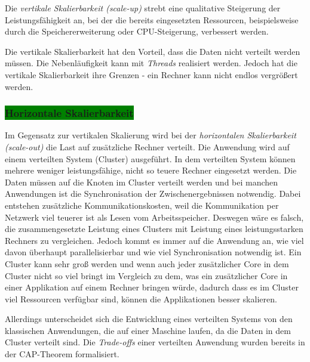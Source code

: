 Die \textit{vertikale Skalierbarkeit (scale-up)} strebt eine qualitative Steigerung der Leistungsfähigkeit an, bei der die bereits eingesetzten Ressourcen, beispielsweise durch die Speichererweiterung oder CPU-Steigerung, verbessert werden.

Die vertikale Skalierbarkeit hat den Vorteil, dass die Daten nicht verteilt werden müssen. Die Nebenläufigkeit kann mit \textit{Threads} realisiert werden. Jedoch hat die vertikale Skalierbarkeit ihre Grenzen - ein Rechner kann nicht endlos vergrößert werden. 

\subsubsection{\colorbox{green}{Horizontale Skalierbarkeit}}

Im Gegensatz zur vertikalen Skalierung wird bei der \textit{horizontalen Skalierbarkeit (scale-out)} die Last auf zusätzliche Rechner verteilt. Die Anwendung wird auf einem verteilten System (Cluster) ausgeführt. In dem verteilten System können mehrere weniger leistungsfähige, nicht so teuere Rechner eingesetzt werden. Die Daten müssen auf die Knoten im Cluster verteilt werden und bei manchen Anwendungen ist die Synchronisation der Zwischenergebnissen notwendig. Dabei entstehen zusätzliche Kommunikationskosten, weil die Kommunikation per Netzwerk viel teuerer ist als Lesen vom Arbeitsspeicher. Deswegen wäre es falsch, die zusammengesetzte Leistung eines Clusters mit Leistung eines leistungsstarken Rechners zu vergleichen. Jedoch kommt es immer auf die Anwendung an, wie viel davon überhaupt parallelisierbar und wie viel Synchronisation notwendig ist. Ein Cluster kann sehr groß werden und wenn auch jeder zusätzlicher Core in dem Cluster nicht so viel bringt im Vergleich zu dem, was ein zusätzlicher Core in einer Applikation auf einem Rechner bringen würde, dadurch dass es im Cluster viel Ressourcen verfügbar sind, können die Applikationen besser skalieren.

Allerdings unterscheidet sich die Entwicklung eines verteilten Systems von den klassischen Anwendungen, die auf einer Maschine laufen, da die Daten in dem Cluster verteilt sind. Die \textit{Trade-offs} einer verteilten Anwendung wurden bereits in der CAP-Theorem formalisiert.

